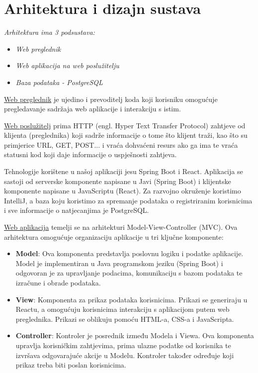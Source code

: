 \chapter{Arhitektura i dizajn sustava}

		\textit{ Arhitektura ima 3 podsustava:}
	\begin{itemize}
		\item 	\textit{Web preglednik}
		\item 	\textit{Web aplikacija na web poslužitelju}
		\item 	\textit{Baza podataka - PostgreSQL }		
	\end{itemize}


{\underline{Web preglednik} je ujedino i prevoditelj koda koji korisniku omogućuje pregledavanje sadržaja web aplikacije i interakciju s istim.}

{\underline{Web poslužitelj} prima HTTP (engl. Hyper
Text Transfer Protocol) zahtjeve od klijenta (preglednika) koji sadrže informacije o tome što klijent traži, kao što su primjerice URL, GET, POST... i vraća dohvaćeni resurs ako ga ima te vraća statusni kod koji daje informacije o uspješnosti zahtjeva.}

{Tehnologije korištene u našoj aplikaciji jesu Spring Boot i React. Aplikacija se sastoji od serverske komponente napisane u Javi (Spring Boot) i klijentske komponente napisane u JavaScriptu (React). Za razvojno okruženje koristimo IntelliJ, a baza koju koristimo za spremanje podataka o registriranim korisnicima i sve informacije o natjecanjima je PostgreSQL.}

{\underline{Web aplikacija} temelji se na arhitekturi Model-View-Controller (MVC). Ova arhitektura omogućuje organizaciju aplikacije u tri ključne komponente:}

\begin{itemize}
    \item \textbf{Model}: Ova komponenta predstavlja poslovnu logiku i podatke aplikacije. Model je implementiran u Java programskom jeziku (Spring Boot) i odgovoran je za upravljanje podacima, komunikaciju s bazom podataka te izračune i obrade podataka.
    
    \item \textbf{View}: Komponenta za prikaz podataka korisnicima. Prikazi se generiraju u Reactu, a omogućuju korisnicima interakciju s aplikacijom putem web preglednika. Prikazi se oblikuju pomoću HTML-a, CSS-a i JavaScripta.
    
    \item \textbf{Controller}: Kontroler je posrednik između Modela i Viewa. Ova komponenta upravlja korisničkim zahtjevima, prima ulazne podatke od korisnika te izvršava odgovarajuće akcije u Modelu. Kontroler također određuje koji prikaz treba biti poslan korisnicima.\\
\end{itemize}	


